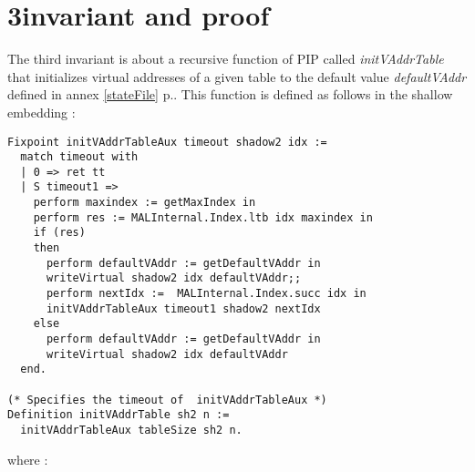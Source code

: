 \section{3\rd invariant and proof} \label{proof3}
The third invariant is about a recursive function of PIP called \textit{initVAddrTable} that initializes virtual addresses of a given table to the default value \textit{defaultVAddr} defined in annex \ref{stateFile} p.\pageref{stateFile}. This function is defined as follows in the shallow embedding : 
\begin{lstlisting}[caption = {initVAddrTable in the shallow embedding}, xleftmargin=-.02\textwidth,
xrightmargin=-.02\textwidth,mathescape=true]
Fixpoint initVAddrTableAux timeout shadow2 idx :=
  match timeout with
  | 0 => ret tt
  | S timeout1 =>
    perform maxindex := getMaxIndex in
    perform res := MALInternal.Index.ltb idx maxindex in
    if (res)
    then
      perform defaultVAddr := getDefaultVAddr in
      writeVirtual shadow2 idx defaultVAddr;;
      perform nextIdx :=  MALInternal.Index.succ idx in
      initVAddrTableAux timeout1 shadow2 nextIdx
    else  
      perform defaultVAddr := getDefaultVAddr in
      writeVirtual shadow2 idx defaultVAddr
  end.

(* Specifies the timeout of  initVAddrTableAux *) 
Definition initVAddrTable sh2 n :=
  initVAddrTableAux tableSize sh2 n.
\end{lstlisting} \vspace{4pt}
where :
